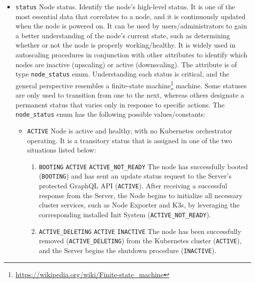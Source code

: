 \begin{itemize}
  \item \texttt{status}
    \newline
    Node status.
    \newline
    Identify the node's high-level status.
    \newline
    It is one of the most essential data that correlates to a node, and it is continuously
    updated when the node is powered on. It can be used by users/administrators
    to gain a better understanding of the node's current state, such as determining
    whether or not the node is properly working/healthy. It is widely used in
    autoscaling procedures in conjunction with other attributes to identify
    which nodes are inactive (upscaling) or active (downscaling).
    \newline
    The attribute is of type \texttt{node\_status} enum. Understanding each status
    is critical, and the general perspective resembles a finite-state machine\footnote{\url{https://wikipedia.org/wiki/Finite-state_machine}}
    machine. Some statuses are only used to transition from one to the next,
    whereas others designate a permanent status that varies only in response to
    specific actions.
    \newline
    The \texttt{node\_status} enum has the following possible values/constants:
    \begin{itemize}
      \item \texttt{ACTIVE}
        \newline
        Node is active and healthy, with no Kubernetes orchestrator operating.
        \newline
        It is a transitory status that is assigned in one of the two situations
        listed below:
        \begin{enumerate}
          \item \texttt{BOOTING}  \texttt{ACTIVE}
             \texttt{ACTIVE\_NOT\_READY}
            \newline
            The node has successfully booted (\texttt{BOOTING}) and has sent an update
            status request to the Server's protected GraphQL API (\texttt{ACTIVE}).
            After receiving a successful response from the Server, the Node
            begins to initialize all necessary cluster services, such as Node Exporter
            and K3s, by leveraging the corresponding installed Init System (\texttt{ACTIVE\_NOT\_READY}).

          \item \texttt{ACTIVE\_DELETING}  \texttt{ACTIVE}
             \texttt{INACTIVE}
            \newline
            The node has been successfully removed (\texttt{ACTIVE\_DELETING}) from
            the Kubernetes cluster (\texttt{ACTIVE}), and the Server begins the shutdown
            procedure (\texttt{INACTIVE}).
        \end{enumerate}


\end{itemize}
\end{itemize}
